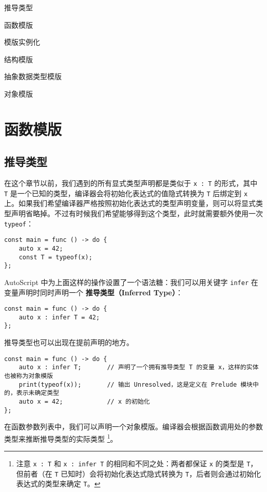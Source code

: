 \begin{introduction}
	\item 推导类型
	\item 函数模版
	\item 模版实例化
	\item 结构模版
	\item 抽象数据类型模版
	\item 对象模版
\end{introduction}

\section{函数模版}

\subsection{推导类型}

在这个章节以前，我们遇到的所有显式类型声明都是类似于 \lstinline!x : T! 的形式，其中 \lstinline!T! 是一个已知的类型，编译器会将初始化表达式的值隐式转换为 \lstinline!T! 后绑定到 \lstinline!x! 上。如果我们希望编译器严格按照初始化表达式的类型声明变量，则可以将显式类型声明省略掉。不过有时候我们希望能够得到这个类型，此时就需要额外使用一次 \lstinline!typeof!：

\begin{lstlisting}
const main = func () -> do {
	auto x = 42;
	const T = typeof(x);
};
\end{lstlisting}

AutoScript 中为上面这样的操作设置了一个语法糖：我们可以用关键字 \lstinline!infer! 在变量声明时同时声明一个 \textbf{推导类型（Inferred Type）}：

\begin{lstlisting}
const main = func () -> do {
	auto x : infer T = 42;
};
\end{lstlisting}

推导类型也可以出现在提前声明的地方。

\begin{lstlisting}
const main = func () -> do {
	auto x : infer T;		// 声明了一个拥有推导类型 T 的变量 x，这样的实体也被称为对象模版
	print(typeof(x));		// 输出 Unresolved，这是定义在 Prelude 模块中的，表示未确定类型
	auto x = 42;			// x 的初始化
};
\end{lstlisting}

在函数参数列表中，我们可以声明一个对象模版。编译器会根据函数调用处的参数类型来推断推导类型的实际类型 \footnote{注意 \lstinline!x : T! 和 \lstinline!x : infer T! 的相同和不同之处：两者都保证 \lstinline!x! 的类型是 \lstinline!T!，但前者（在 \lstinline!T! 已知时）会将初始化表达式隐式转换为 \lstinline!T!，后者则会通过初始化表达式的类型来确定 \lstinline!T!。}。

